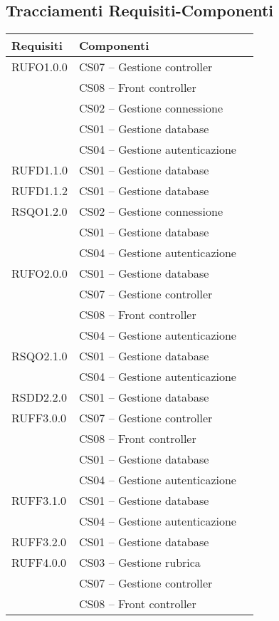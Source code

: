 \subsection{Tracciamenti Requisiti-Componenti}\label{sec:tracRecComp}

\begin{center}
\begin{longtable}{lp{}l}
\toprule Requisiti &  Componenti\\
\midrule
RUFO1.0.0 & CS07 -- Gestione controller \\
 & CS08 -- Front controller \\
 & CS02 -- Gestione connessione \\
 & CS01 -- Gestione database \\
 & CS04 -- Gestione autenticazione \\
RUFD1.1.0 & CS01 -- Gestione database \\
RUFD1.1.2 & CS01 -- Gestione database \\
RSQO1.2.0 & CS02 -- Gestione connessione \\
 & CS01 -- Gestione database \\
  & CS04 -- Gestione autenticazione \\
RUFO2.0.0 & CS01 -- Gestione database \\
 & CS07 -- Gestione controller \\
 & CS08 -- Front controller \\
  & CS04 -- Gestione autenticazione \\
RSQO2.1.0 & CS01 -- Gestione database \\
 & CS04 -- Gestione autenticazione \\
RSDD2.2.0 & CS01 -- Gestione database \\
RUFF3.0.0 & CS07 -- Gestione controller \\
 & CS08 -- Front controller \\
 & CS01 -- Gestione database \\
  & CS04 -- Gestione autenticazione \\
RUFF3.1.0 & CS01 -- Gestione database \\
 & CS04 -- Gestione autenticazione \\
RUFF3.2.0 & CS01 -- Gestione database \\
RUFF4.0.0 & CS03 -- Gestione rubrica \\
 & CS07 -- Gestione controller \\
  & CS08 -- Front controller \\

\end{longtable}
\end{center}

